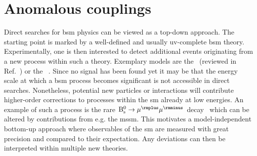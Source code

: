 
\section{Anomalous couplings}
\label{sec:theory-anomalous-couplings}

Direct searches for \gls{bsm} physics can be viewed as a top-down approach. The starting point is marked by a well-defined and usually \gls{uv}-complete \gls{bsm} theory. Experimentally, one is then interested to detect additional events originating from a new process within such a theory. Exemplary models are the ~(reviewed in Ref.~\cite{Csaki:1996ks}) or the ~\cite{Branco:2011iw}. Since no signal has been found yet it may be that the energy scale at which a \gls{bsm} process becomes significant is not accessible in direct searches. Nonetheless, potential new particles or interactions will contribute higher-order corrections to processes within the \gls{sm} already at low energies. An example of such a process is the rare $\mathrm{B}^{0}_\mathrm{s}\to\mu^{\rmplus}\mu^{\rmminus}$ decay~\cite{CMS:2014xfa} which can be altered by contributions from e.g. the \gls{mssm}. This motivates a model-independent bottom-up approach where observables of the \gls{sm} are measured with great precision and compared to their expectation. Any deviations can then be interpreted within multiple new theories.

